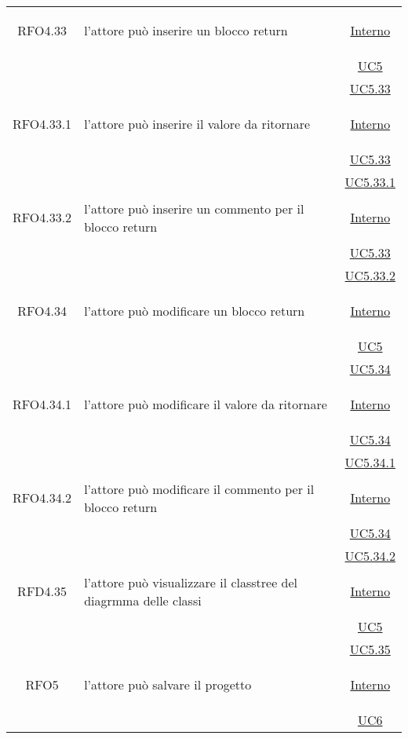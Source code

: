 \begin{longtable}{|c|>{\centering}m{7cm}|c|}
\hypertarget{RFO4.33}{RFO4.33} & l'attore può inserire un blocco return & \hyperlink{Interno}{Interno}\\
& &\hyperref[UC5]{UC5}\\
& &\hyperref[UC5.33]{UC5.33}\\ \hline

\hypertarget{RFO4.33.1}{RFO4.33.1} & l'attore può inserire il valore da ritornare & \hyperlink{Interno}{Interno}\\
& &\hyperref[UC5.33]{UC5.33}\\
& &\hyperref[UC5.33.1]{UC5.33.1}\\ \hline

\hypertarget{RFO4.33.2}{RFO4.33.2} & l'attore può inserire un commento per il blocco return & \hyperlink{Interno}{Interno}\\
& &\hyperref[UC5.33]{UC5.33}\\
& &\hyperref[UC5.33.2]{UC5.33.2}\\ \hline

\hypertarget{RFO4.34}{RFO4.34} & l'attore può modificare un blocco return & \hyperlink{Interno}{Interno}\\
& &\hyperref[UC5]{UC5}\\
& &\hyperref[UC5.34]{UC5.34}\\ \hline

\hypertarget{RFO4.34.1}{RFO4.34.1} & l'attore può modificare il valore da ritornare & \hyperlink{Interno}{Interno}\\
& &\hyperref[UC5.34]{UC5.34}\\
& &\hyperref[UC5.34.1]{UC5.34.1}\\ \hline

\hypertarget{RFO4.34.2}{RFO4.34.2} & l'attore può modificare il commento per il blocco return & \hyperlink{Interno}{Interno}\\
& &\hyperref[UC5.34]{UC5.34}\\
& &\hyperref[UC5.34.2]{UC5.34.2}\\ \hline

\hypertarget{RFD4.35}{RFD4.35} & l'attore può visualizzare il classtree del diagrmma delle classi & \hyperlink{Interno}{Interno}\\
& &\hyperref[UC5]{UC5}\\
& &\hyperref[UC5.35]{UC5.35}\\ \hline

\hypertarget{RFO5}{RFO5} & l'attore può salvare il progetto &  \hyperlink{Interno}{Interno}\\
& & \hyperref[UC6]{UC6}\\ \hline


\end{longtable}
